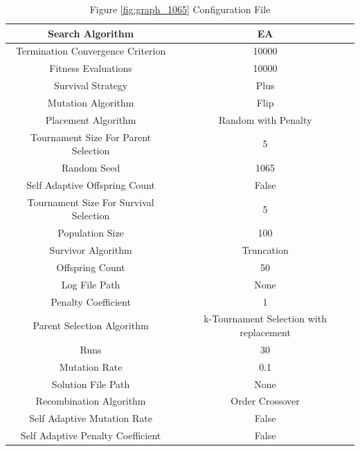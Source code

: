 \documentclass{standalone}
\begin{document}
\begin{table}[!htb]
	\centering
	\caption{Figure \ref{fig:graph_1065} Configuration File}
	\label{tab:graph_1065}
	\begin{tabular}{| c | c |}
		\hline
		Search Algorithm		& EA		 \\
		\hline
		Termination Convergence Criterion		& 10000		 \\
		\hline
		Fitness Evaluations		& 10000		 \\
		\hline
		Survival Strategy		& Plus		 \\
		\hline
		Mutation Algorithm		& Flip		 \\
		\hline
		Placement Algorithm		& Random with Penalty		 \\
		\hline
		Tournament Size For Parent Selection		& 5		 \\
		\hline
		Random Seed		& 1065		 \\
		\hline
		Self Adaptive Offspring Count		& False		 \\
		\hline
		Tournament Size For Survival Selection		& 5		 \\
		\hline
		Population Size		& 100		 \\
		\hline
		Survivor Algorithm		& Truncation		 \\
		\hline
		Offspring Count		& 50		 \\
		\hline
		Log File Path		& None		 \\
		\hline
		Penalty Coefficient		& 1		 \\
		\hline
		Parent Selection Algorithm		& k-Tournament Selection with replacement		 \\
		\hline
		Runs		& 30		 \\
		\hline
		Mutation Rate		& 0.1		 \\
		\hline
		Solution File Path		& None		 \\
		\hline
		Recombination Algorithm		& Order Crossover		 \\
		\hline
		Self Adaptive Mutation Rate		& False		 \\
		\hline
		Self Adaptive Penalty Coefficient		& False		 \\
		\hline
	\end{tabular}
\end{table}
\end{document}
